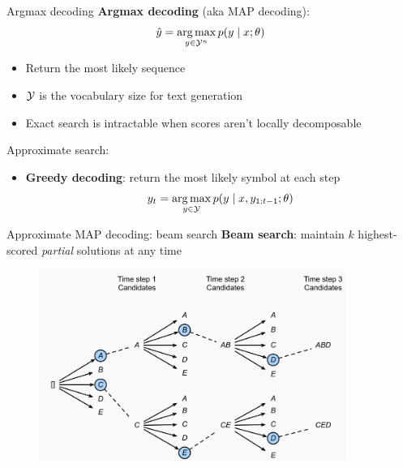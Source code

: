 \documentclass[usenames,dvipsnames,11pt,aspectratio=169]{beamer}
\begin{document}
\begin{frame}
    {Argmax decoding}
    \textbf{Argmax decoding} (aka MAP decoding): 
    $$
    \hat{y} = \operatorname*{arg\,max}_{y\in\mathcal{Y}^n} p(y\mid x; \theta)
    $$
    \vspace{-1em}
    \begin{itemize}
        \item Return the most likely sequence
        \item $\mathcal{Y}$ is the vocabulary size for text generation
        \item Exact search is intractable when scores aren't locally decomposable
    \end{itemize}

    Approximate search:\\
    \begin{itemize}
        \item \textbf{Greedy decoding}: return the most likely symbol at each step
            $$
            y_t = \operatorname*{arg\,max}_{y\in\mathcal{Y}} p(y\mid x, y_{1:t-1}; \theta)
            $$
    \end{itemize}
\end{frame}

\begin{frame}
    {Approximate MAP decoding: beam search}
    \textbf{Beam search}: maintain $k$ highest-scored \textit{partial} solutions at any time
    \vspace{-1em}
    \begin{figure}
        \includegraphics[width=10cm]{figures/beam-search}
    \end{figure}
\end{frame}
\end{document}
